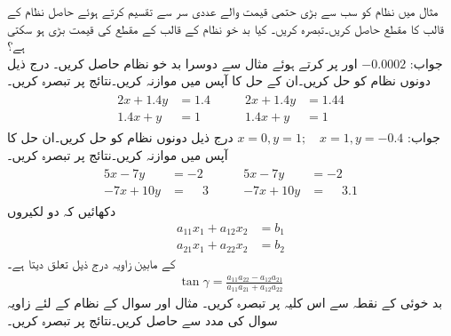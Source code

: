 
\quad
مثال  میں نظام کو سب سے بڑی حتمی قیمت والے عددی سر سے تقسیم کرتے ہوئے حاصل نظام کے قالب کا مقطع حاصل کریں۔تبصرہ کریں۔ کیا بد خو نظام کے قالب کے مقطع کی قیمت بڑی ہو سکتی ہے؟\\
جواب:\quad
$-0.0002$
\quad
{} اور  پر کرتے ہوئے مثال  سے دوسرا بد خو نظام حاصل کریں۔ 
\quad
درج ذیل دونوں نظام کو حل کریں۔ان کے حل کا آپس میں موازنہ کریں۔نتائج پر تبصرہ کریں۔
\begin{gather*}
\begin{aligned}
2x+1.4y&=1.4\\
1.4x+y&=1
\end{aligned}\quad\quad
\begin{aligned}
2x+1.4y&=1.44\\
1.4x+y&=1
\end{aligned}
\end{gather*}
جواب:\quad
$x=0,y=1;\quad x=1,y=-0.4$
\quad
درج ذیل دونوں نظام کو حل کریں۔ان حل کا آپس میں موازنہ کریں۔نتائج پر تبصرہ کریں۔
\begin{gather*}
\begin{aligned}
5x-7y&=-2\\
-7x+10y&=\phantom{-}3
\end{aligned}\quad\quad
\begin{aligned}
5x-7y&=-2\\
-7x+10y&=\phantom{-}3.1
\end{aligned}
\end{gather*}
\quad
دکھائیں کہ دو لکیروں
\begin{align*}
a_{11}x_1+a_{12}x_2&=b_1\\
a_{21}x_1+a_{22}x_2&=b_2
\end{align*}
کے مابین زاویہ  درج ذیل تعلق دیتا ہے۔
\begin{align*}
\tan \gamma=\frac{a_{11}a_{22}-a_{12}a_{21}}{a_{11}a_{21}+a_{12}a_{22}}
\end{align*}
بد خوئی کے نقطہ سے اس کلیہ پر تبصرہ کریں۔
\quad
مثال  اور سوال  کے نظام کے لئے زاویہ  سوال  کی مدد سے حاصل کریں۔نتائج پر تبصرہ کریں۔
